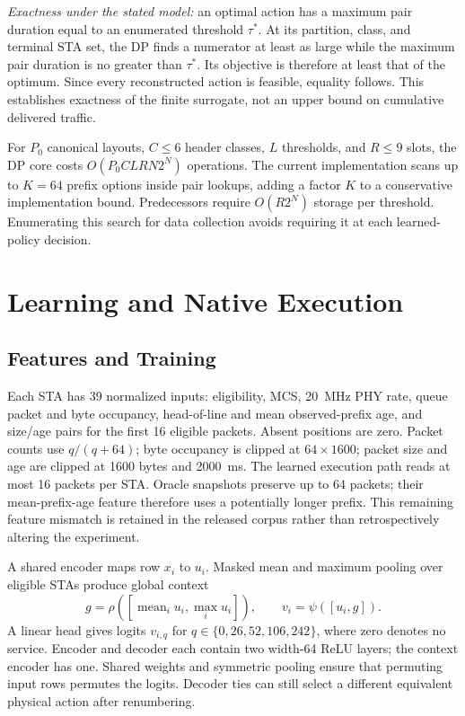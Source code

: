 \documentclass[lettersize,journal]{IEEEtran}
\begin{document}
\emph{Exactness under the stated model:} an optimal action has a maximum
pair duration equal to an enumerated threshold $\tau^*$. At its partition,
class, and terminal STA set, the DP finds a numerator at least as large
while the maximum pair duration is no greater than $\tau^*$. Its objective
is therefore at least that of the optimum. Since every reconstructed action
is feasible, equality follows. This establishes exactness of the finite
surrogate, not an upper bound on cumulative delivered traffic.

For $P_0$ canonical layouts, $C\leq6$ header classes, $L$ thresholds, and
$R\leq9$ slots, the DP core costs $O(P_0CLR N2^N)$ operations. The current
implementation scans up to $K=64$ prefix options inside pair lookups,
adding a factor $K$ to a conservative implementation bound. Predecessors
require $O(R2^N)$ storage per threshold. Enumerating this search for data
collection avoids requiring it at each learned-policy decision.

\section{Learning and Native Execution}
\subsection{Features and Training}
Each STA has 39 normalized inputs: eligibility, MCS, 20~MHz PHY rate, queue
packet and byte occupancy, head-of-line and mean observed-prefix age, and
size/age pairs for the first 16 eligible packets. Absent positions are zero.
Packet counts use $q/(q+64)$; byte occupancy is clipped at $64\times1600$;
packet size and age are clipped at 1600 bytes and 2000~ms. The learned
execution path reads at most 16 packets per STA. Oracle snapshots preserve
up to 64 packets; their mean-prefix-age feature therefore uses a potentially
longer prefix. This remaining feature mismatch is retained in the released
corpus rather than retrospectively altering the experiment.

A shared encoder maps row $x_i$ to $u_i$. Masked mean and maximum pooling
over eligible STAs produce global context
\begin{equation}
 g=\rho\left(\left[\operatorname{mean}_i u_i,
                           \operatorname{max}_i u_i\right]\right),\qquad
 v_i=\psi([u_i,g]).
\end{equation}
A linear head gives logits $v_{i,q}$ for
$q\in\{0,26,52,106,242\}$, where zero denotes no service. Encoder and
decoder each contain two width-64 ReLU layers; the context encoder has one.
Shared weights and symmetric pooling ensure that permuting input rows
permutes the logits. Decoder ties can still select a different equivalent
physical action after renumbering.
\end{document}
